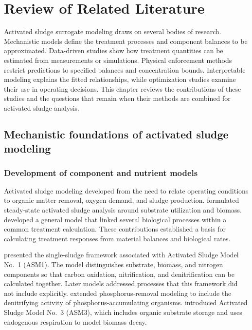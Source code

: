 \chapter{Review of Related Literature}
\label{ch:literature}

Activated sludge surrogate modeling draws on several bodies of research. Mechanistic models define the treatment processes and component balances to be approximated. Data-driven studies show how treatment quantities can be estimated from measurements or simulations. Physical enforcement methods restrict predictions to specified balances and concentration bounds. Interpretable modeling explains the fitted relationships, while optimization studies examine their use in operating decisions. This chapter reviews the contributions of these studies and the questions that remain when their methods are combined for activated sludge analysis.

\section{Mechanistic foundations of activated sludge modeling}

\subsection{Development of component and nutrient models}

Activated sludge modeling developed from the need to relate operating conditions to organic matter removal, oxygen demand, and sludge production. \citet{Marais1976} formulated steady-state activated sludge analysis around substrate utilization and biomass. \citet{Dold1981} developed a general model that linked several biological processes within a common treatment calculation. These contributions established a basis for calculating treatment responses from material balances and biological rates.

\citet{Henze1987} presented the single-sludge framework associated with Activated Sludge Model No.\ 1 (ASM1). The model distinguishes substrate, biomass, and nitrogen components so that carbon oxidation, nitrification, and denitrification can be calculated together. Later models addressed processes that this framework did not include explicitly. \citet{Henze1999} extended phosphorus-removal modeling to include the denitrifying activity of phosphorus-accumulating organisms. \citet{Gujer1999} introduced Activated Sludge Model No.\ 3 (ASM3), which includes organic substrate storage and uses endogenous respiration to model biomass decay.

